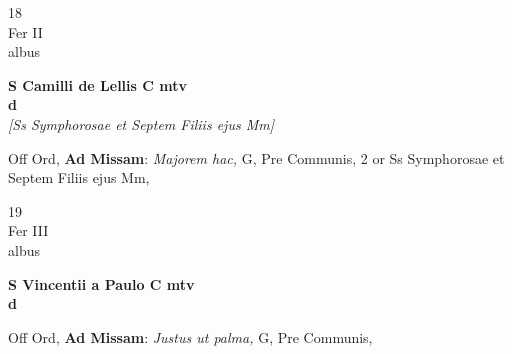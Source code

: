 \documentclass[10pt, openany]{book}
\begin{document}
        \begin{center}
            \begin{minipage}{3.5in}
                \vspace{2em}
                \begin{minipage}{0.5in}
                    {\Huge 18} \\
                    {\normalsize Fer II} \\
                    {\normalsize albus}
                \end{minipage}
                \begin{minipage}{3.0in}
                    \textbf{ \large S Camilli de Lellis C mtv \\
                    \textnormal{\normalsize d}} \\ \textit{[Ss Symphorosae et Septem Filiis ejus Mm]} \\ 
                \end{minipage}
                \begin{justify}Off Ord, \textbf{Ad Missam}: \textit{Majorem hac,} G, Pre Communis, 2 or Ss Symphorosae et Septem Filiis ejus Mm,   
                \end{justify}
            \end{minipage}
        \end{center}
    
        \begin{center}
            \begin{minipage}{3.5in}
                \vspace{2em}
                \begin{minipage}{0.5in}
                    {\Huge 19} \\
                    {\normalsize Fer III} \\
                    {\normalsize albus}
                \end{minipage}
                \begin{minipage}{3.0in}
                    \textbf{ \large S Vincentii a Paulo C mtv \\
                    \textnormal{\normalsize d}} \\ 
                \end{minipage}
                \begin{justify}Off Ord, \textbf{Ad Missam}: \textit{Justus ut palma,} G, Pre Communis,   
                \end{justify}
            \end{minipage}
        \end{center}
    
\end{document}
